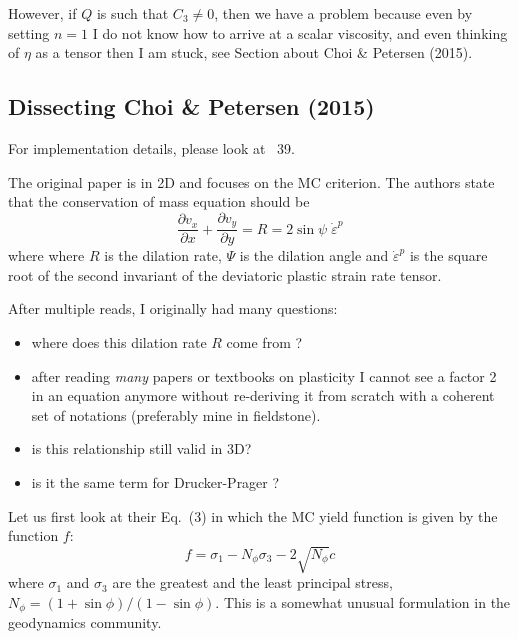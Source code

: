 However, if $Q$ is such that $C_3\neq 0$, then we have a problem because 
even by setting $n=1$ I do not know how to arrive at a scalar viscosity, 
and even thinking of $\eta$ as a tensor then I am stuck, see Section about 
Choi \& Petersen (2015).





\newpage
\subsection{Dissecting Choi \& Petersen (2015)}

For implementation details, please look at \stone~39. 

The original paper \cite{chpe15} is in 2D and focuses on the MC criterion. 
The authors state that the conservation of mass equation 
should be 
\[
\frac{\partial v_x}{\partial x}
+
\frac{\partial v_y}{\partial y}
=
R=2 \sin \psi \; \dot{\varepsilon}^p
\]
where where $R$ is the dilation rate, $\Psi$ is the dilation angle and
$\dot{\varepsilon}^p$ is the square root of the second invariant of the deviatoric plastic strain rate tensor.

After multiple reads, I originally had many questions:
\begin{itemize}
\item where does this dilation rate $R$ come from ? 
\item after reading \textit{many} papers or textbooks on plasticity 
I cannot see a factor 2 in an equation anymore without re-deriving 
it from scratch with a coherent set of notations (preferably mine in fieldstone). 
\item is this relationship still valid in 3D?
\item is it the same term for Drucker-Prager ?
\end{itemize}

\vspace{1cm}

Let us first look at their Eq.~(3)  in which  
the MC yield function is given by the function $f$:
\[
f = \sigma_1 - N_\phi \sigma_3 - 2 \sqrt{N_\phi} c 
\]
where $\sigma_1$ and $\sigma_3$ are the greatest and the least principal stress, $N_\phi=(1+\sin \phi)/(1-\sin \phi)$.
This is a somewhat unusual formulation in the geodynamics community.

